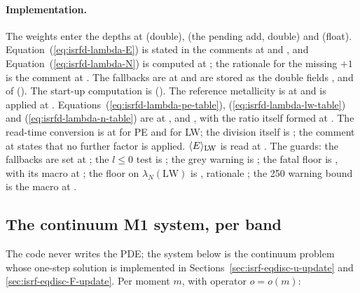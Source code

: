 \paragraph{Implementation.} The weights enter the depths at
 (double),  (the pending add, double)
and  (float).
Equation~(\ref{eq:isrfd-lambda-E}) is stated in the comments at
 and , and
Equation~(\ref{eq:isrfd-lambda-N}) is computed at ;
the rationale for the missing $+1$ is the comment at . The
fallbacks are at  and are stored as the double fields
,  and
 of 
(). The start-up computation is
 (). The
reference metallicity is at  and is applied at
. Equations~(\ref{eq:isrfd-lambda-pe-table}),
(\ref{eq:isrfd-lambda-lw-table}) and (\ref{eq:isrfd-lambda-n-table}) are at
,  and , with the ratio itself
formed at . The read-time conversion is at
 for PE and  for LW; the
division itself is ; the comment at
 states that no further factor is applied.
$\langle E\rangle_{\rm LW}$ is read at . The guards: the
fallbacks are set at ; the $l \le 0$ test is
; the grey warning is ; the fatal
floor is , with its macro at ; the
floor on $\lambda_N(\mathrm{LW})$ is , rationale
; the 250 warning bound is the macro at .

\subsection{The continuum M1 system, per band}
\label{sec:isrf-eqdisc-continuum}

The code never writes the PDE; the system below is the continuum problem whose
one-step solution is implemented in Sections~\ref{sec:isrf-eqdisc-u-update} and
\ref{sec:isrf-eqdisc-F-update}. Per moment $m$, with operator $o = o(m)$:

